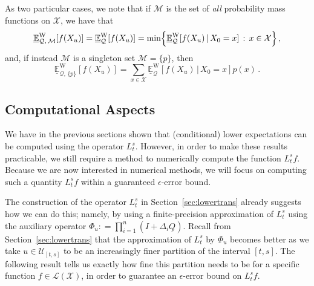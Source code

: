 \documentclass[10pt,a4paper]{paper}
\theoremstyle{definition}
\newcommand{\states}{\mathcal{X}}
\newcommand{\gambles}{\mathcal{L}}
\newcommand{\gamblesX}{\gambles(\states)}
\newcommand{\rateset}{\mathcal{Q}}
\newcommand{\lrate}{\underline{Q}}
\newcommand{\coloneqq}{:\!=}
\begin{document}
As two particular cases, we note that if $\mathcal{M}$ is the set of \emph{all} probability mass functions on $\states$, we have that
\begin{equation*}
\underline{\mathbb{E}}_{\rateset,\,\mathcal{M}}^\mathrm{W}[f(X_u)] = \underline{\mathbb{E}}_{\rateset}^\mathrm{W}[f(X_u)] = \min\Bigl\{  \underline{\mathbb{E}}_{\rateset}^\mathrm{W}[f(X_u)\,\vert\,X_0=x] \,:\,x\in\states\Bigr\}\,,
\end{equation*}
and, if instead $\mathcal{M}$ is a singleton set $\mathcal{M}=\{p\}$, then
\begin{equation*}
\underline{\mathbb{E}}_{\rateset,\,\{p\}}^\mathrm{W}[f(X_u)] = \sum_{x\in\states} \underline{\mathbb{E}}_{\rateset}^\mathrm{W}[f(X_u)\,\vert\,X_0=x]p(x)\,.
\end{equation*}

%
%
%

\subsection{Computational Aspects}\label{sec:tractability}

We have in the previous sections shown that (conditional) lower expectations can be computed using the operator $L_t^s$. However, in order to make these results practicable, we still require a method to numerically compute the function $L_t^sf$. Because we are now interested in numerical methods, we will focus on computing such a quantity $L_t^sf$ within a guaranteed $\epsilon$-error bound. 

The construction of the operator $L_t^s$ in Section~\ref{sec:lowertrans} already suggests how we can do this; namely, by using a finite-precision approximation of $L_t^s$ using the auxiliary operator $\Phi_u\coloneqq \prod_{i=1}^n(I+\Delta_i\lrate)$. Recall from Section~\ref{sec:lowertrans} that the approximation of $L_t^s$ by $\Phi_u$ becomes better as we take $u\in\mathcal{U}_{[t,s]}$ to be an increasingly finer partition of the interval $[t,s]$. The following result tells us exactly how fine this partition needs to be for a specific function $f\in\gamblesX$, in order to guarantee an $\epsilon$-error bound on $L_t^sf$.
\end{document}
